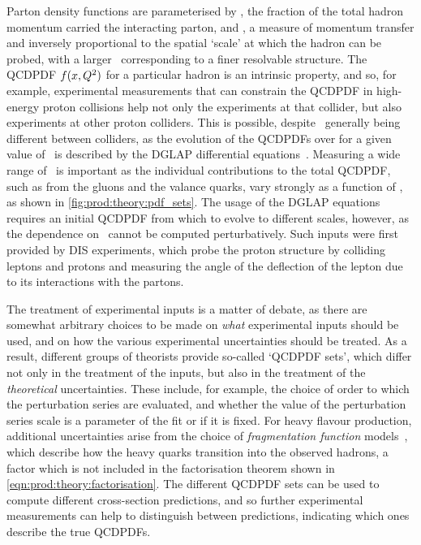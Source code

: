 Parton density functions are parameterised by \bjorkenx, the fraction of the 
total hadron momentum carried the interacting parton, and \pdfqsquared, a 
measure of momentum transfer and inversely proportional to the spatial `scale' 
at which the hadron can be probed, with a larger \pdfqsquared\ corresponding to 
a finer resolvable structure.
The \ac{QCDPDF} $f(x, Q^{2})$ for a particular hadron is an 
intrinsic property, and so, for example, experimental measurements that can 
constrain the \ac{QCDPDF} in high-energy proton collisions help not only the 
experiments at that collider, but also experiments at other proton colliders.
This is possible, despite \pdfqsquared\ generally being different between 
colliders, as the evolution of the \acp{QCDPDF} over \pdfqsquared for a given 
value of \bjorkenx\ is described by the \ac{DGLAP} differential 
equations~\cite{Gribov:1972ri,Dokshitzer:1977sg,Altarelli:1977zs}.
Measuring a wide range of \bjorkenx\ is important as the individual 
contributions to the total \ac{QCDPDF}, such as from the gluons and the valance 
quarks, vary strongly as a function of \bjorkenx, as shown in 
\cref{fig:prod:theory:pdf_sets}.
The usage of the \ac{DGLAP} equations requires an initial \ac{QCDPDF} from 
which to evolve to different scales, however, as the dependence on \bjorkenx\ 
cannot be computed perturbatively.
Such inputs were first provided by \ac{DIS} experiments, which probe the proton 
structure by colliding leptons and protons and measuring the angle of the 
deflection of the lepton due to its interactions with the partons.

The treatment of experimental inputs is a matter of debate, as there are 
somewhat arbitrary choices to be made on \emph{what} experimental inputs should 
be used, and on how the various experimental uncertainties should be 
treated.
As a result, different groups of theorists provide so-called `\ac{QCDPDF} 
sets', which differ not only in the treatment of the inputs, but also in the 
treatment of the \emph{theoretical} uncertainties.
These include, for example, the choice of order to which the perturbation 
series are evaluated, and whether the value of the perturbation series scale is 
a parameter of the fit or if it is fixed.
For heavy flavour production, additional uncertainties arise from the choice of 
\emph{fragmentation function} models~\cite{Kneesch:2007ey}, which describe how 
the heavy quarks transition into the observed hadrons, a factor which is not 
included in the factorisation theorem shown in 
\cref{eqn:prod:theory:factorisation}.\footnotemark
The different \ac{QCDPDF} sets can be used to compute different cross-section 
predictions, and so further experimental measurements can help to distinguish 
between predictions, indicating which ones describe the true \acp{QCDPDF}.

